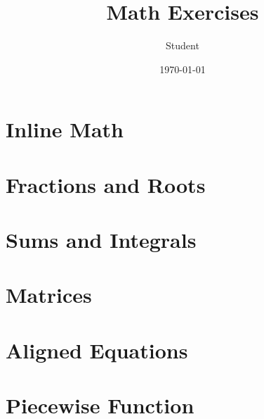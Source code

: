 \documentclass[12pt,a4paper]{article}
\title{Math Exercises}
\author{Student}
\date{\today}
\begin{document}
\maketitle

\section{Inline Math}



\section{Fractions and Roots}



\section{Sums and Integrals}



\section{Matrices}



\section{Aligned Equations}



\section{Piecewise Function}
\end{document}
